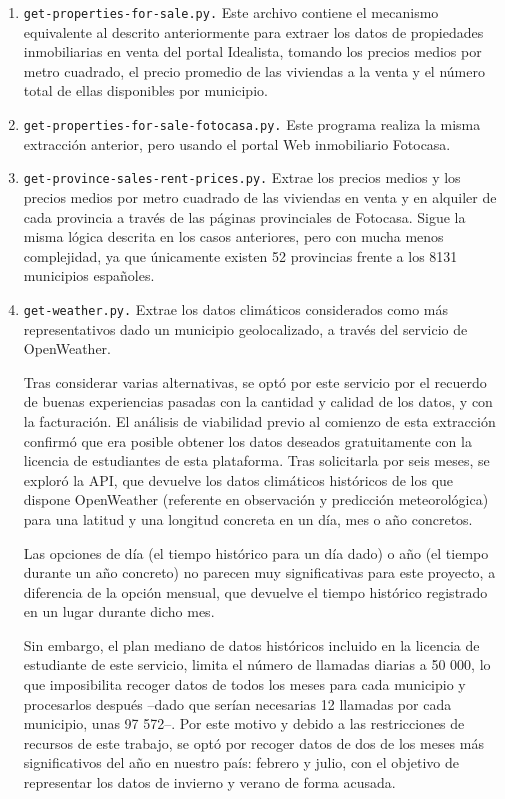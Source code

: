 \begin{enumerate}
    \item \texttt{get-properties-for-sale.py.} Este archivo contiene el mecanismo equivalente al descrito anteriormente para extraer los datos de propiedades inmobiliarias en venta del portal Idealista, tomando los precios medios por metro cuadrado, el precio promedio de las viviendas a la venta y el número total de ellas disponibles por municipio.

    \item \texttt{get-properties-for-sale-fotocasa.py.} Este programa realiza la misma extracción anterior, pero usando el portal Web inmobiliario Fotocasa.

    \item \texttt{get-province-sales-rent-prices.py.} Extrae los precios medios y los precios medios por metro cuadrado de las viviendas en venta y en alquiler de cada provincia a través de las páginas provinciales de Fotocasa. Sigue la misma lógica descrita en los casos anteriores, pero con mucha menos complejidad, ya que únicamente existen 52 provincias frente a los 8131 municipios españoles.

    \item \texttt{get-weather.py.} Extrae los datos climáticos considerados como más representativos dado un municipio geolocalizado, a través del servicio de OpenWeather.

    Tras considerar varias alternativas, se optó por este servicio por el recuerdo de buenas experiencias pasadas con la cantidad y calidad de los datos, y con la facturación. El análisis de viabilidad previo al comienzo de esta extracción confirmó que era posible obtener los datos deseados gratuitamente con la licencia de estudiantes de esta plataforma. Tras solicitarla por seis meses, se exploró la API, que devuelve los datos climáticos históricos de los que dispone OpenWeather (referente en  observación y predicción meteorológica) para una latitud y una longitud concreta en un día, mes o año concretos.
    
    Las opciones de día (el tiempo histórico para un día dado) o año (el tiempo durante un año concreto) no parecen muy significativas para este proyecto, a diferencia de la opción mensual, que devuelve el tiempo histórico registrado en un lugar durante dicho mes.
    
    Sin embargo, el plan mediano de datos históricos incluido en la licencia de estudiante de este servicio, limita el número de llamadas diarias a 50 000, lo que imposibilita recoger datos de todos los meses para cada municipio y procesarlos después –dado que serían necesarias 12 llamadas por cada municipio, unas 97 572–. Por este motivo y debido a las restricciones de recursos de este trabajo, se optó por recoger datos de dos de los meses más significativos del año en nuestro país: febrero y julio, con el objetivo de representar los datos de invierno y verano de forma acusada.
    

\end{enumerate}
